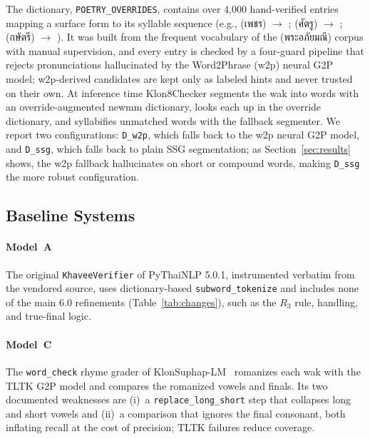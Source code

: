 \documentclass[conference]{IEEEtran}
\newcommand{\thtxt}[1]{{\thaifont #1}}      %
\newcommand{\thgloss}[2]{\textipa{#1} (\thtxt{#2})}   %
\newcommand{\thtxt}[1]{}
\newcommand{\thgloss}[2]{#1}
\begin{document}
The dictionary, \texttt{POETRY\_OVERRIDES}, contains over 4{,}000
hand-verified entries mapping a surface form to its syllable sequence (e.g.,
\thgloss{\emph{p\super{h}\'et}}{เพชร} $\rightarrow$ ; \thgloss{\emph{s\`attru:}}{ศัตรู} $\rightarrow$
; \thgloss{\emph{k\`as\`atri:}}{กษัตรี} $\rightarrow$ ). It was
built from the frequent vocabulary of the
\thgloss{\emph{p\super{h}r\'a P\`ap\super{h}aI m\'ani:}}{พระอภัยมณี} corpus with
manual supervision, and every entry is checked by a four-guard pipeline
that rejects pronunciations hallucinated by the Word2Phrase (w2p) neural
G2P model; w2p-derived candidates are kept only as labeled hints and never
trusted on their own. At inference time Klon8Checker segments the wak into
words with an override-augmented newmm dictionary, looks each up in the
override dictionary, and syllabifies unmatched words with the fallback
segmenter. We report two configurations: \texttt{D\_w2p}, which falls back
to the w2p neural G2P model, and \texttt{D\_ssg}, which falls back to
plain SSG segmentation; as Section~\ref{sec:results} shows, the w2p
fallback hallucinates on short or compound words, making \texttt{D\_ssg}
the more robust configuration.

\subsection{Baseline Systems}

\paragraph*{Model~A}
The original \texttt{KhaveeVerifier} of PyThaiNLP 5.0.1, instrumented
verbatim from the vendored source, uses dictionary-based
\texttt{subword\_tokenize} and includes none of the main 6.0 refinements
(Table~\ref{tab:changes}), such as the
$R_3$ rule,  handling, and true-final logic.

\paragraph*{Model~C}
The \texttt{word\_check} rhyme grader of KlonSuphap-LM~\cite{klonsuphap}
romanizes each wak with the TLTK G2P model and compares the romanized
vowels and finals. Its two documented weaknesses are
(i)~a \texttt{replace\_long\_short} step that collapses long and short vowels
and (ii)~a  comparison that ignores the final consonant,
both inflating recall at the cost of precision; TLTK failures reduce
coverage.
\end{document}
